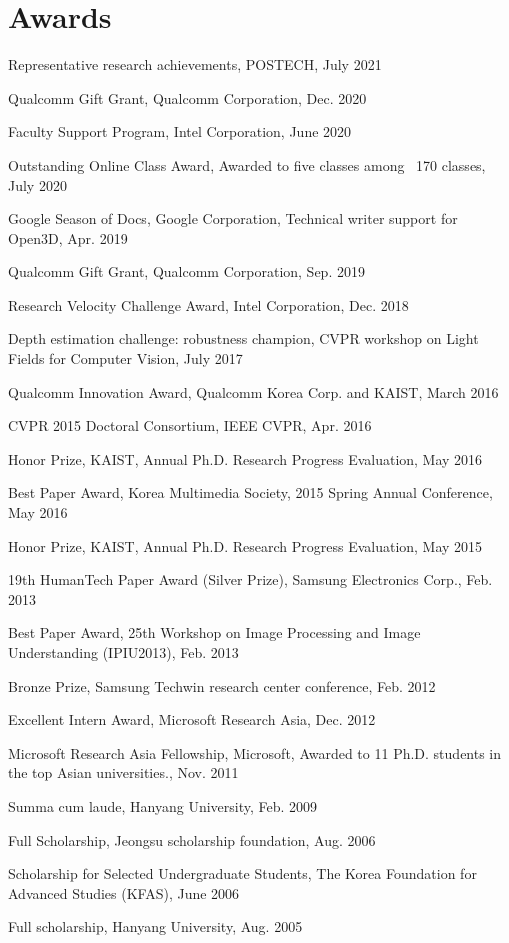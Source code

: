 \documentclass[letterpaper,11pt]{article}
\newcommand{\resumeItem}[1]{
  \small{
  \item{#1 \vspace{-2pt}}
  }
}
\newcommand{\resumeItemListStart}{\begin{itemize}}
\newcommand{\resumeItemListEnd}{\end{itemize}\vspace{-5pt}}
\begin{document}
\section{Awards}
\resumeItemListStart
    \resumeItem{Representative research achievements, POSTECH, July 2021}
    \resumeItem{Qualcomm Gift Grant, Qualcomm Corporation, Dec. 2020}
    \resumeItem{Faculty Support Program, Intel Corporation, June 2020}
    \resumeItem{Outstanding Online Class Award, Awarded to five classes among ~170 classes, July 2020}
    \resumeItem{Google Season of Docs, Google Corporation, Technical writer support for Open3D, Apr. 2019}
    \resumeItem{Qualcomm Gift Grant, Qualcomm Corporation, Sep. 2019}
    \resumeItem{Research Velocity Challenge Award, Intel Corporation, Dec. 2018}
    \resumeItem{Depth estimation challenge: robustness champion, CVPR workshop on Light Fields for Computer Vision, July 2017}
    \resumeItem{Qualcomm Innovation Award, Qualcomm Korea Corp. and KAIST, March 2016}
    \resumeItem{CVPR 2015 Doctoral Consortium, IEEE CVPR, Apr. 2016}
    \resumeItem{Honor Prize, KAIST, Annual Ph.D. Research Progress Evaluation, May 2016}
    \resumeItem{Best Paper Award, Korea Multimedia Society, 2015 Spring Annual Conference, May 2016}
    \resumeItem{Honor Prize, KAIST, Annual Ph.D. Research Progress Evaluation, May 2015}
    \resumeItem{19th HumanTech Paper Award (Silver Prize), Samsung Electronics Corp., Feb. 2013}
    \resumeItem{Best Paper Award, 25th Workshop on Image Processing and Image Understanding (IPIU2013), Feb. 2013}
    \resumeItem{Bronze Prize, Samsung Techwin research center conference, Feb. 2012}
    \resumeItem{Excellent Intern Award, Microsoft Research Asia, Dec. 2012}
    \resumeItem{Microsoft Research Asia Fellowship, Microsoft, Awarded to 11 Ph.D. students in the top Asian universities., Nov. 2011}
    \resumeItem{Summa cum laude, Hanyang University, Feb. 2009}
    \resumeItem{Full Scholarship, Jeongsu scholarship foundation, Aug. 2006}
    \resumeItem{Scholarship for Selected Undergraduate Students, The Korea Foundation for Advanced Studies (KFAS), June 2006}
    \resumeItem{Full scholarship, Hanyang University, Aug. 2005}
\resumeItemListEnd
\end{document}

